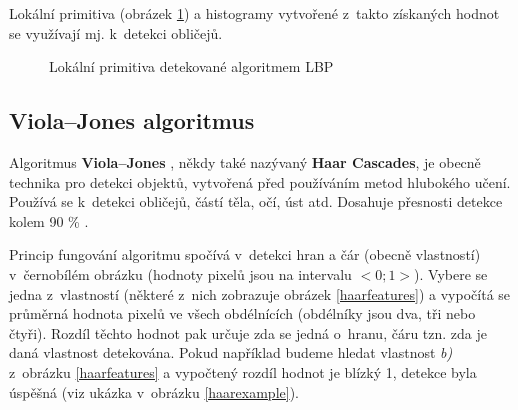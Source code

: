 Lokální primitiva (obrázek \ref{lbpprimitives}) a histogramy vytvořené z~takto získaných hodnot se využívají mj. k~detekci obličejů.

\begin{figure}[H]
  \begin{center}
  \label{lbpprimitives}
  \caption{Lokální primitiva detekované algoritmem LBP \cite{localBinaryPatternsTests}}
  \end{center}
\end{figure}

\subsection*{Viola--Jones algoritmus}
\label{sekce:viola_jones}
Algoritmus \textbf{Viola--Jones} \cite{violaJonesArticle, violaJones}, někdy také nazývaný \textbf{Haar Cascades}, je obecně technika pro detekci objektů, vytvořená před používáním metod hlubokého učení. Používá se k~detekci obličejů, částí těla, očí, úst atd. Dosahuje přesnosti detekce kolem 90 \% \cite{violaJones}. 

Princip fungování algoritmu spočívá v~detekci hran a čár (obecně vlastností) v~černobílém obrázku (hodnoty pixelů jsou na intervalu $<0; 1>$). Vybere se jedna z~vlastností (některé z~nich zobrazuje obrázek \ref{haarfeatures}) a vypočítá se průměrná hodnota pixelů ve všech obdélnících (obdélníky jsou dva, tři nebo čtyři). Rozdíl těchto hodnot pak určuje zda se jedná o~hranu, čáru tzn. zda je daná vlastnost detekována. Pokud například budeme hledat vlastnost \emph{b)} z~obrázku \ref{haarfeatures} a vypočtený rozdíl hodnot je blízký 1, detekce byla úspěšná (viz ukázka v~obrázku \ref{haarexample}).

